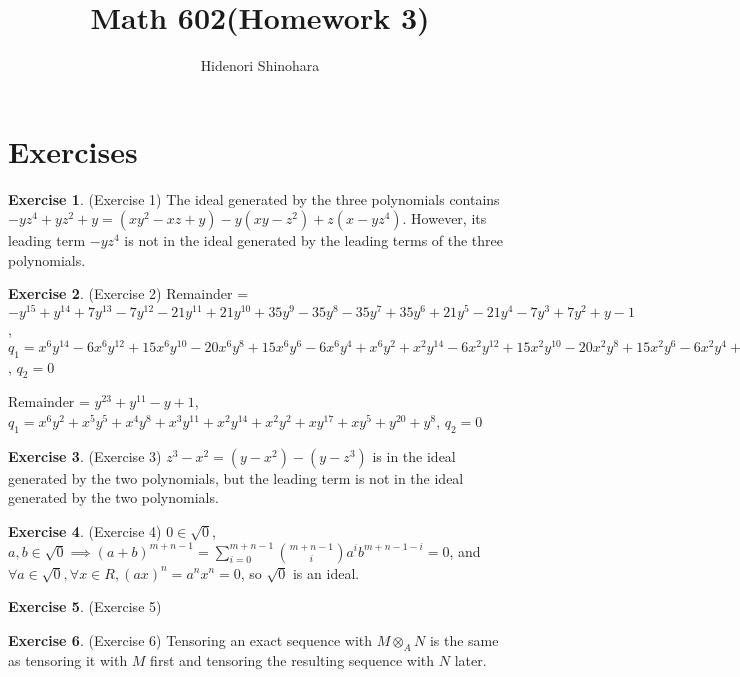 \documentclass[12pt, psamsfonts]{amsart}
\theoremstyle{definition}
\newtheorem*{exer}{Exercise}
\theoremstyle{remark}
\numberwithin{equation}{section}
\begin{document}
\title{Math 602(Homework 3)}
\author{Hidenori Shinohara}
\maketitle

\section{Exercises}

\begin{exer}{(Exercise 1)}
  The ideal generated by the three polynomials contains $-yz^4 + yz^2 + y = (xy^2 - xz + y) - y(xy - z^2) + z(x - yz^4)$.
  However, its leading term $-yz^4$ is not in the ideal generated by the leading terms of the three polynomials. 
\end{exer}

\begin{exer}{(Exercise 2)}
Remainder = $-y^{15} + y^{14} + 7 y^{13} - 7 y^{12} - 21 y^{11} + 21 y^{10} + 35 y^{9} - 35 y^{8} - 35 y^{7} + 35 y^{6} + 21 y^{5} - 21 y^{4} - 7 y^{3} + 7 y^{2} + y - 1$,
$q_1 = x^{6}y^{14} - 6 x^{6}y^{12} + 15 x^{6}y^{10} - 20 x^{6}y^{8} + 15 x^{6}y^{6} - 6 x^{6}y^{4} + x^{6}y^{2} + x^{2}y^{14} - 6 x^{2}y^{12} + 15 x^{2}y^{10} - 20 x^{2}y^{8} + 15 x^{2}y^{6} - 6 x^{2}y^{4} + x^{2}y^{2}$,
$q_2 = 0$
 
Remainder = $y^{23} + y^{11} - y + 1$,
$q_1 = x^{6}y^{2} + x^{5}y^{5} + x^{4}y^{8} + x^{3}y^{11} + x^{2}y^{14} + x^{2}y^{2} + xy^{17} + xy^{5} + y^{20} + y^{8}$,
$q_2 = 0$
\end{exer}

\begin{exer}{(Exercise 3)}
  $z^3 - x^2 = (y - x^2) - (y - z^3)$ is in the ideal generated by the two polynomials, but the leading term is not in the ideal generated by the two polynomials.
\end{exer}

\begin{exer}{(Exercise 4)}
  $0 \in \sqrt{0}$, $a, b \in \sqrt{0} \implies (a + b)^{m + n - 1} = \sum_{i=0}^{m + n - 1} \binom{m + n - 1}{i} a^ib^{m + n - 1 - i} = 0$, and $\forall a \in \sqrt{0}, \forall x \in R, (ax)^n = a^nx^n = 0$, so $\sqrt{0}$ is an ideal.
\end{exer}

\begin{exer}{(Exercise 5)}
\end{exer}

\begin{exer}{(Exercise 6)}
  Tensoring an exact sequence with $M \otimes_A N$ is the same as tensoring it with $M$ first and tensoring the resulting sequence with $N$ later.
\end{exer}
\end{document}
